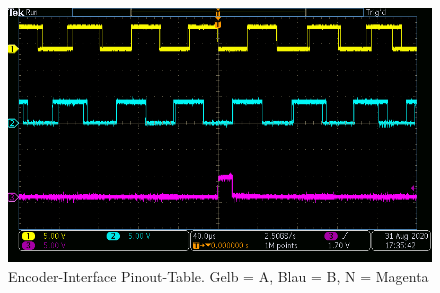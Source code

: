 \begin{figure}[H]
	\centering
	\includegraphics[width=\textwidth]{graphics/AMT322S-V_Signal}
	\caption{Encoder-Interface Pinout-Table. Gelb = A, Blau = B, N = Magenta}
	\label{fig:AMT322S-V_Signal}
\end{figure}
